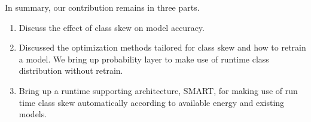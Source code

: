 \documentclass{article}
\begin{document}

In summary, our contribution remains in three parts.
\begin{enumerate}
  \item Discuss the effect of class skew on model accuracy.
  \item  Discussed the optimization methods tailored for class skew and how to retrain a model. We bring up probability layer to make use of runtime class distribution without retrain. 
  \item  Bring up a runtime supporting architecture, SMART, for making use of run time class skew automatically according to available energy and existing models.
\end{enumerate}

\end{document}
